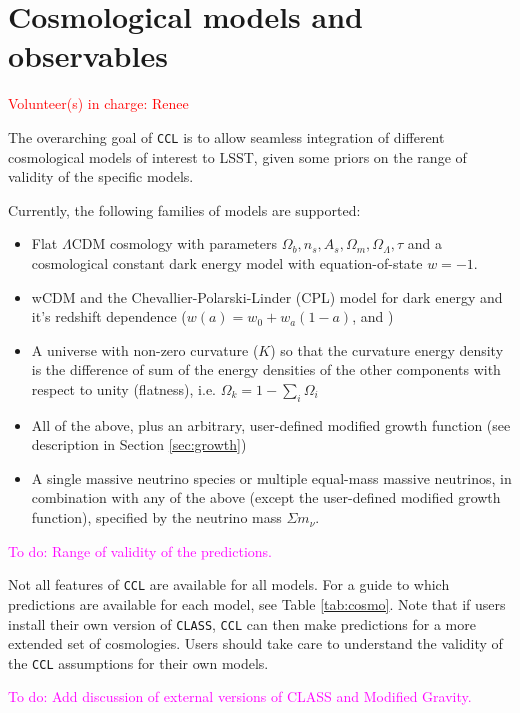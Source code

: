 \documentclass[\docopts]{\docclass}
\newcommand{\todo}[1]{\textcolor{magenta}{To do: #1}}
\newcommand{\vol}[1]{\textcolor{red}{Volunteer(s) in charge: #1}}
\newcommand{\ccl}{{\tt CCL}\xspace}
\begin{document}
\section{Cosmological models and observables}
\vol{Renee}

The overarching goal of \ccl is to allow seamless integration of different cosmological models of interest to LSST, given some priors on the range of validity of the specific models. 

Currently, the following families of models are supported:
\begin{itemize}
 \item Flat $\Lambda$CDM cosmology with parameters $\Omega_b, n_s, A_s, \Omega_m, \Omega_\Lambda, \tau$ and a cosmological constant dark energy model with equation-of-state $w=-1.$ 
 \item wCDM and the Chevallier-Polarski-Linder (CPL) model for dark energy and it's redshift dependence ($w(a) = w_0+w_a(1-a)$, \citealt{Chevallier01} and \citealt{Linder03})
 \item A universe with non-zero curvature ($K$) so that the curvature energy density is the difference of sum of the energy densities of the other components with respect to unity (flatness), i.e. $\Omega_k = 1- \sum_i \Omega_i$
 \item All of the above, plus an arbitrary, user-defined modified growth function (see description in Section \ref{sec:growth})
  \item A single massive neutrino species or multiple equal-mass massive neutrinos, in combination with any of the above (except the user-defined modified growth function), specified by the neutrino mass $\Sigma m_\nu$.
\end{itemize}

\todo{Range of validity of the predictions.}

Not all features of \ccl are available for all models. For a guide to which predictions are available for each model, see Table \ref{tab:cosmo}. Note that if users install their own version of {\tt CLASS}, {\tt CCL} can then make predictions for a more extended set of cosmologies. Users should take care to understand the validity of the {\tt CCL} assumptions for their own models. 



\todo{Add discussion of external versions of CLASS and Modified Gravity.}

\end{document}
